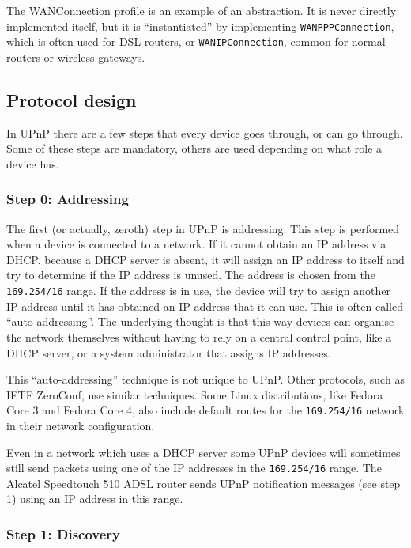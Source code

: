 \documentclass[10pt]{article}
\begin{document}
The WANConnection profile is an example of an abstraction. It is never
directly implemented itself, but it is ``instantiated'' by implementing
\texttt{WANPPPConnection}, which is often used for DSL routers,
or \texttt{WANIPConnection}, common for normal routers or wireless
gateways.


\subsection{Protocol design}

In UPnP there are a few steps that every device goes through, or can go
through. Some of these steps are mandatory, others are used depending on
what role a device has.

\subsubsection{Step 0: Addressing}

The first (or actually, zeroth) step in UPnP is addressing. This step is
performed when a device is connected to a network. If it cannot obtain an IP
address via DHCP, because a DHCP server is absent, it will assign an IP
address to itself and try to determine if the IP address is unused. The
address is chosen from the \texttt{169.254/16} range. If the address is in
use, the device will try to assign another IP address until it has obtained
an IP address that it can use. This is often called ``auto-addressing''. The
underlying thought is that this way devices can organise the network
themselves without having to rely on a central control point, like a DHCP
server, or a system administrator that assigns IP addresses.

This ``auto-addressing'' technique is not unique to UPnP. Other protocols,
such as IETF ZeroConf, use similar techniques. Some Linux distributions,
like Fedora Core 3 and Fedora Core 4, also include default routes for the
\texttt{169.254/16} network in their network configuration.

Even in a network which uses a DHCP server some UPnP devices will sometimes
still send packets using one of the IP addresses in the \texttt{169.254/16}
range. The Alcatel Speedtouch 510 ADSL router sends UPnP notification messages
(see step 1) using an IP address in this range.


\subsubsection{Step 1: Discovery}
\end{document}
